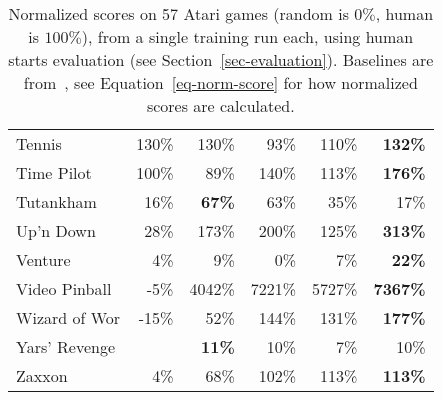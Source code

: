 \documentclass[a4paper]{article}
\begin{document}
\begin{table*}[p]
{{\begin{tabular}{|l|rr|rrr|}
Tennis & 130\% & 130\% & 93\% & 110\% & \textbf{132\%}\\
Time Pilot & 100\% & 89\% & 140\% & 113\% & \textbf{176\%}\\
Tutankham & 16\% & \textbf{67\%} & 63\% & 35\% & 17\%\\
Up'n Down & 28\% & 173\% & 200\% & 125\% & \textbf{313\%}\\
Venture & 4\% & 9\% & 0\% & 7\% & \textbf{22\%}\\
Video Pinball & -5\% & 4042\% & 7221\% & 5727\% & \textbf{7367\%}\\
Wizard of Wor & -15\% & 52\% & 144\% & 131\% & \textbf{177\%}\\
Yars' Revenge &  & \textbf{11\%} & 10\% & 7\% & 10\%\\
Zaxxon & 4\% & 68\% & 102\% & 113\% & \textbf{113\%}\\
\hline
\end{tabular}
  



} } 

\caption{
\label{tab-atari-normalized-30human}
Normalized scores on 57 Atari games (random is $0\%$, human is $100\%$), from a single training run each, using human starts evaluation (see Section~\ref{sec-evaluation}).
Baselines are from~\citet{double-dqn}, see Equation~\ref{eq-norm-score} for how normalized scores are calculated.
}
\end{table*}
\end{document}
